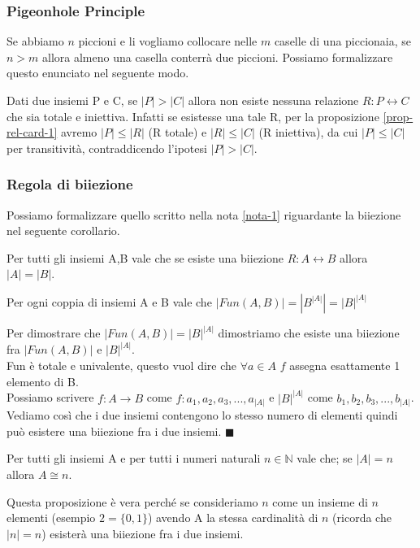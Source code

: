 \subsubsection{Pigeonhole Principle}
Se abbiamo $n$ piccioni e li vogliamo collocare nelle $m$ caselle di una piccionaia, se $n > m$ allora almeno una casella conterrà due piccioni. Possiamo formalizzare questo enunciato nel seguente modo.
\begin{definition}
    Dati due insiemi P e C, se $|P| > |C|$ allora non esiste nessuna relazione $R: P \leftrightarrow C$ che sia totale e iniettiva. Infatti se esistesse una tale R, per la proposizione \ref{prop-rel-card-1} avremo $|P| \leq |R|$ (R totale) e $|R| \leq |C|$ (R iniettiva), da cui $|P| \leq |C|$ per transitività, contraddicendo l'ipotesi $|P| > |C|$.
\end{definition}

\subsubsection{Regola di biiezione}
Possiamo formalizzare quello scritto nella nota \ref{nota-1} riguardante la biiezione nel seguente corollario.
\begin{corollar}\label{regola-biiezione}
Per tutti gli insiemi A,B vale che se esiste una biiezione $R: A \leftrightarrow B$ allora $|A| = |B|$.
\end{corollar}

\begin{proposition}
Per ogni coppia di insiemi A e B vale che $|Fun(A,B)| = |B^{|A|}| = |B|^{|A|}$
\end{proposition}

\begin{demostration}
    Per dimostrare che $|Fun(A,B)| = |B|^{|A|}$ dimostriamo che esiste una biiezione fra $|Fun(A,B)|$ e $|B|^{|A|}$.\\
    Fun è totale e univalente, questo vuol dire che $\forall a \in A$ $f$ assegna esattamente 1 elemento di B.\\
    Possiamo scrivere $f: A \to B$ come $f: a_1, a_2, a_3, ..., a_{|A|}$ e $|B|^{|A|}$ come $b_1, b_2, b_3, ..., b_{|A|}$.\\
    Vediamo così che i due insiemi contengono lo stesso numero di elementi quindi può esistere una biiezione fra i due insiemi. $\blacksquare$
\end{demostration}

\begin{proposition}\label{proprosizione-reg-bii-1}
Per tutti gli insiemi A e per tutti i numeri naturali $n\in \mathbb{N}$ vale che; se $|A| = n$ allora $A \cong n$.
\end{proposition}
\hspace{-15pt}Questa proposizione è vera perché se consideriamo $n$ come un insieme di $n$ elementi (esempio $2 = \{0,1\}$) avendo A la stessa cardinalità di $n$ (ricorda che $|n| = n$) esisterà una biiezione fra i due insiemi.

